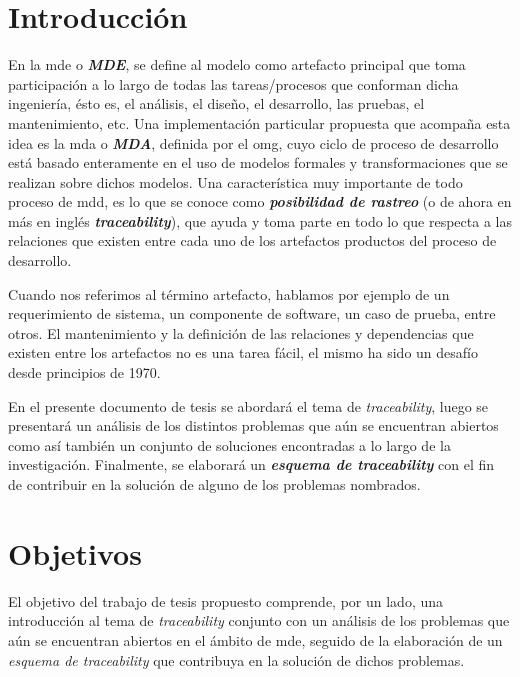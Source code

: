 \documentclass[a4paper,12pt,oneside,spanish]{book}
\begin{document}


\chapter{Introducción}


En la \gls{mde} o \textit{\textbf{MDE}}, se define al modelo como artefacto principal que toma participación a lo largo de todas las tareas/procesos que conforman dicha ingeniería, ésto es, el análisis, el diseño, el desarrollo, las pruebas, el mantenimiento, etc. Una implementación particular propuesta que acompaña esta idea es la \gls{mda}  o \textit{\textbf{MDA}}, definida por el \gls{omg}, cuyo ciclo de proceso de desarrollo está basado enteramente en el uso de modelos formales y transformaciones que se realizan sobre dichos modelos. Una característica muy importante de todo proceso de \gls{mdd}, es lo que se conoce como \textit{\textbf{posibilidad de rastreo}} (o de ahora en más en inglés \textit{\textbf{traceability}}), que ayuda y toma parte en todo lo que respecta a las relaciones que existen entre cada uno de los artefactos productos del proceso de desarrollo.

Cuando nos referimos al término artefacto, hablamos por ejemplo de un requerimiento de sistema, un componente de software, un caso de prueba, entre otros. El mantenimiento y la definición de las relaciones y dependencias que existen entre los artefactos no es una tarea fácil, el mismo ha sido un desafío desde principios de 1970.

En el presente documento de tesis se abordará el tema de \textit{traceability}, luego se presentará un análisis de los distintos problemas que aún se encuentran abiertos como así también un conjunto de soluciones encontradas a lo largo de la investigación. Finalmente, se elaborará un \textit{\textbf{esquema de traceability}} con el fin de contribuir en la solución de alguno de los problemas nombrados.




\chapter{Objetivos}


El objetivo del trabajo de tesis propuesto comprende, por un lado, una introducción al tema de \textit{traceability} conjunto con un análisis de los problemas que aún se encuentran abiertos en el ámbito de \gls{mde}, seguido de la elaboración de un \textit{esquema de traceability} que contribuya en la solución de dichos problemas.
\end{document}
